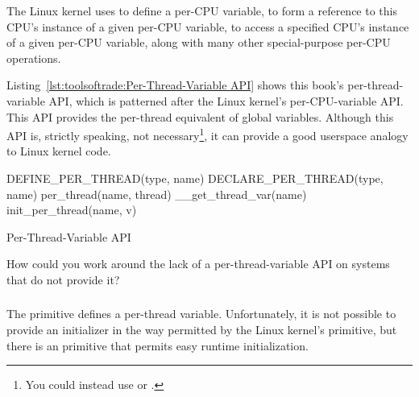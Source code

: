 The Linux kernel uses  to define a per-CPU variable,
 to form a reference to this CPU's instance of a
given per-CPU variable,  to access a specified CPU's
instance of a given per-CPU variable, along with many other special-purpose
per-CPU operations.

Listing~\ref{lst:toolsoftrade:Per-Thread-Variable API}
shows this book's per-thread-variable API, which is patterned
after the Linux kernel's per-CPU-variable API.
This API provides the per-thread equivalent of global variables.
Although this API is, strictly speaking, not necessary\footnote{
	You could instead use  or .},
it can provide a good userspace analogy to Linux kernel code.

\begin{listing}[tbp]
\begin{VerbatimL}[numbers=none]
DEFINE_PER_THREAD(type, name)
DECLARE_PER_THREAD(type, name)
per_thread(name, thread)
__get_thread_var(name)
init_per_thread(name, v)
\end{VerbatimL}
\caption{Per-Thread-Variable API}
\label{lst:toolsoftrade:Per-Thread-Variable API}
\end{listing}

\QuickQuiz{}
	How could you work around the lack of a per-thread-variable
	API on systems that do not provide it?
 \QuickQuizEnd

\subsubsection{}

The  primitive defines a per-thread variable.
Unfortunately, it is not possible to provide an initializer in the way
permitted by the Linux kernel's  primitive,
but there is an  primitive that permits easy
runtime initialization.

